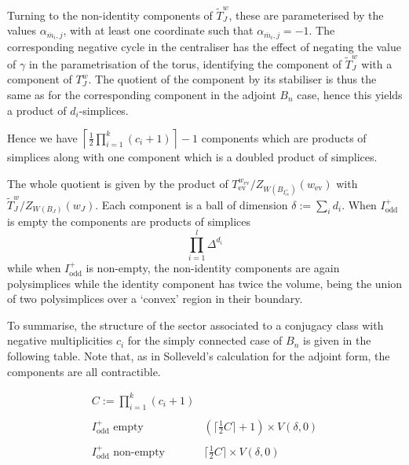 \documentclass[11pt,a4paper]{article}
\def\mbar{\overline{m}}
\def\mbar{\overline{m}}
\def\coveringtorus{\tilde{T}}
\def\ev{\mathrm{ev}}
\def\odd{\mathrm{odd}}
\begin{document}
\bigskip

 Turning to the non-identity components of  $\coveringtorus_J^w$, these are parameterised by the values $\alpha_{\mbar_i,j}$, with at least one coordinate such that $\alpha_{\mbar_i,j}=-1$.  The corresponding negative cycle in the centraliser has the effect of negating the value of $\gamma$ in the parametrisation of the torus, identifying the component of $\coveringtorus_J^w$ with a component of $T_J^w$.  The quotient of the component by its stabiliser is thus the same as for the corresponding component in the adjoint $B_n$ case, hence this yields a product of $d_i$-simplices.

Hence we have $\left\lceil \frac 12 \prod_{i=1}^k (c_i+1)\right\rceil-1$ components which are products of simplices along with one component which is a doubled product of simplices.

The whole quotient is given by the product of $T_\ev^{w_{\ev}}/Z_{W(B_{I^+_{\ev}})}(w_{\ev})$ with $\coveringtorus_J^w/Z_{W(B_{J})}(w_{J})$. 
Each component is a ball of dimension $\delta:=
\sum_i d_i$. When $I^+_{\odd}$ is empty the components are products of simplices
\[
\prod_{i=1}^l\Delta^{d_i}
\]
while when $I^+_{\odd}$ is non-empty, the non-identity components are again polysimplices while the identity component has twice the volume, being the union of two polysimplices over a `convex' region in their boundary.

To summarise, the structure of the sector associated to a conjugacy class with negative multiplicities $c_i$ for the simply connected case of $B_n$ is given in the following table. Note that, as in Solleveld's calculation for the adjoint form, the components are all contractible.



\begin{table}[H]
\[
\begin{array}{c|c}
   C:=\prod_{i=1}^k (c_i+1) &\\
   &\\
 \hline
 I^+_\odd \text{ empty}   & (\lceil \frac 12 C \rceil +1)\times V(\delta,0)   
 \\
 \\
  I^+_\odd \text{ non-empty}    & \lceil \frac 12 C \rceil\times V(\delta,0)
\end{array}
\]

\bigskip

    \caption{\label{simply_connected_B_n_sectors}The structure of a sector for the simply connected form of $B_n$}
\end{table}
\end{document}
